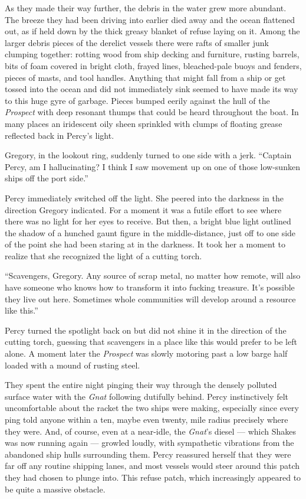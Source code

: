 \documentclass[
]{scrbook}
\begin{document}
As they made their way further, the debris in the water grew more
abundant. The breeze they had been driving into earlier died away and
the ocean flattened out, as if held down by the thick greasy blanket of
refuse laying on it. Among the larger debris pieces of the derelict
vessels there were rafts of smaller junk clumping together: rotting wood
from ship decking and furniture, rusting barrels, bits of foam covered
in bright cloth, frayed lines, bleached-pale buoys and fenders, pieces
of masts, and tool handles. Anything that might fall from a ship or get
tossed into the ocean and did not immediately sink seemed to have made
its way to this huge gyre of garbage. Pieces bumped eerily against the
hull of the \emph{Prospect} with deep resonant thumps that could be
heard throughout the boat. In many places an iridescent oily sheen
sprinkled with clumps of floating grease reflected back in Percy's
light.

Gregory, in the lookout ring, suddenly turned to one side with a jerk.
``Captain Percy, am I hallucinating? I think I saw movement up on one of
those low-sunken ships off the port side.''

Percy immediately switched off the light. She peered into the darkness
in the direction Gregory indicated. For a moment it was a futile effort
to see where there was no light for her eyes to receive. But then, a
bright blue light outlined the shadow of a hunched gaunt figure in the
middle-distance, just off to one side of the point she had been staring
at in the darkness. It took her a moment to realize that she recognized
the light of a cutting torch.

``Scavengers, Gregory. Any source of scrap metal, no matter how remote,
will also have someone who knows how to transform it into fucking
treasure. It's possible they live out here. Sometimes whole communities
will develop around a resource like this.''

Percy turned the spotlight back on but did not shine it in the direction
of the cutting torch, guessing that scavengers in a place like this
would prefer to be left alone. A moment later the \emph{Prospect} was
slowly motoring past a low barge half loaded with a mound of rusting
steel.

\bigskip

They spent the entire night pinging their way through the densely
polluted surface water with the \emph{Gnat} following dutifully behind.
Percy instinctively felt uncomfortable about the racket the two ships
were making, especially since every ping told anyone within a ten, maybe
even twenty, mile radius precisely where they were. And, of course, even
at a near-idle, the \emph{Gnat}'s diesel --- which Shakes was now
running again --- growled loudly, with sympathetic vibrations from the
abandoned ship hulls surrounding them. Percy reassured herself that they
were far off any routine shipping lanes, and most vessels would steer
around this patch they had chosen to plunge into. This refuse patch,
which increasingly appeared to be quite a massive obstacle.
\end{document}
